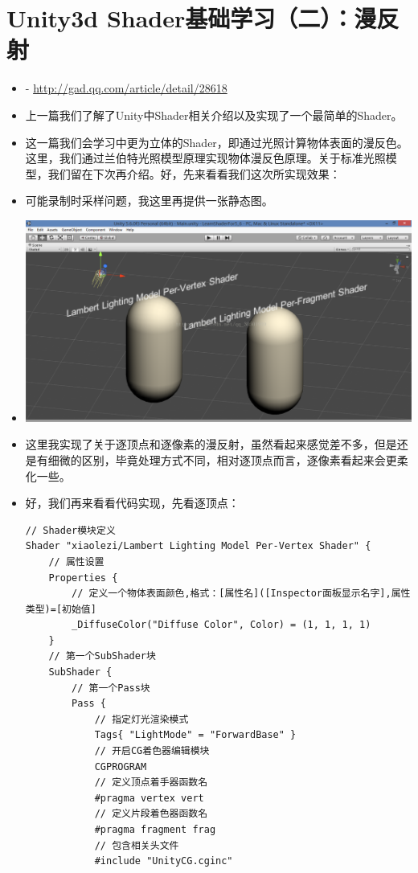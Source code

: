 \documentclass[9pt, b5paper]{article}
\begin{document}
\section{Unity3d Shader基础学习（二）：漫反射}
\label{sec-2}
\begin{itemize}
\item - \url{http://gad.qq.com/article/detail/28618}
\item 上一篇我们了解了Unity中Shader相关介绍以及实现了一个最简单的Shader。
\item 这一篇我们会学习中更为立体的Shader，即通过光照计算物体表面的漫反色。这里，我们通过兰伯特光照模型原理实现物体漫反色原理。关于标准光照模型，我们留在下次再介绍。好，先来看看我们这次所实现效果：
\item 可能录制时采样问题，我这里再提供一张静态图。
\item \includegraphics[width=.9\linewidth]{./pic/shader-compare.png}
\item 这里我实现了关于逐顶点和逐像素的漫反射，虽然看起来感觉差不多，但是还是有细微的区别，毕竟处理方式不同，相对逐顶点而言，逐像素看起来会更柔化一些。
\item 好，我们再来看看代码实现，先看逐顶点：
\begin{verbatim}
// Shader模块定义  
Shader "xiaolezi/Lambert Lighting Model Per-Vertex Shader" {  
    // 属性设置  
    Properties {  
        // 定义一个物体表面颜色,格式：[属性名]([Inspector面板显示名字],属性类型)=[初始值]  
        _DiffuseColor("Diffuse Color", Color) = (1, 1, 1, 1)  
    }  
    // 第一个SubShader块  
    SubShader {  
        // 第一个Pass块  
        Pass {  
            // 指定灯光渲染模式  
            Tags{ "LightMode" = "ForwardBase" }  
            // 开启CG着色器编辑模块  
            CGPROGRAM  
            // 定义顶点着手器函数名  
            #pragma vertex vert  
            // 定义片段着色器函数名  
            #pragma fragment frag  
            // 包含相关头文件  
            #include "UnityCG.cginc"      

\end{verbatim}
\end{itemize}
\end{document}
